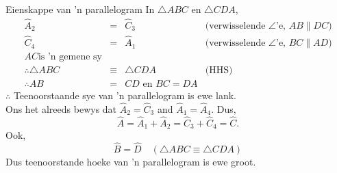\begin{wex}{Eienskappe van 'n parallelogram}
{ 
In $\triangle ABC$ en $\triangle CDA$,
\begin{equation*}
 \begin{array}{rcll}
\hat{A}_{2} &=& \hat{C}_{3} & \mbox{(verwisselende $\angle$'e, $AB \parallel DC$)} \\
\hat{C}_{4} &=& \hat{A}_{1} & \mbox{(verwisselende $\angle$'e, $BC \parallel AD$)} \\
AC \mbox{is 'n gemene sy} &\\
\therefore \triangle ABC &\equiv& \triangle CDA & \mbox{(HHS)} \\
\therefore AB &=& CD \mbox{ en } BC = DA &
 \end{array}
\end{equation*}
$\therefore$ Teenoorstaande sye van 'n parallelogram is ewe lank.\\

Ons het alreeds bewys dat $\hat{A}_2 = \hat{C}_3$ and $\hat{A}_1 =
\hat{A}_4$. Dus,
\begin{equation*}
  \hat{A} = \hat{A}_1 + \hat{A}_2 = \hat{C}_3 + \hat{C}_4 = \hat{C}.
\end{equation*}
Ook,
\begin{equation*}
  \hat{B} = \hat{D} \quad (\triangle ABC \equiv \triangle CDA)
\end{equation*}
Dus teenoorstande hoeke van 'n parallelogram is ewe groot.
}
\end{wex}

